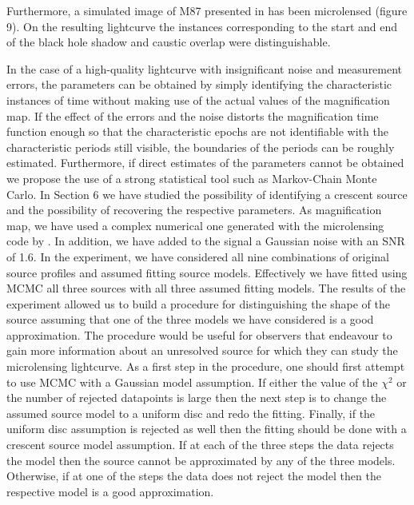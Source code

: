 \documentclass[usenatbib]{mn2e}
\begin{document}
Furthermore, a simulated image of M87 presented in \citep{2012MNRAS.421.1517D} has been microlensed (figure 9). On the resulting lightcurve the instances 
corresponding to the start and end of the black hole shadow and caustic overlap were distinguishable.
    

In the case of a high-quality lightcurve with insignificant noise and measurement errors, the parameters can be obtained 
by simply identifying the characteristic instances of time without making use of the actual values of the magnification
 map. If the effect of the errors and the noise distorts the magnification time function enough so that the 
characteristic epochs are not identifiable with the characteristic periods still visible, the boundaries of the periods 
can be roughly estimated. Furthermore, if direct estimates of the parameters cannot be obtained we propose the use of a strong
statistical tool such as Markov-Chain Monte Carlo. In Section 6  we have studied the possibility of identifying a crescent 
source and  the possibility of recovering the respective parameters. As magnification map, we have used a complex numerical 
one generated with the microlensing code by \cite{1999A&A...346L...5W}. In addition, we have added to the signal a Gaussian 
noise with an SNR of 1.6.  In the experiment, we have considered all nine combinations of original source profiles and assumed fitting source models.
Effectively we have fitted using MCMC all three sources with all three assumed fitting models. The results of the experiment allowed us to build a 
procedure for distinguishing the shape of the source assuming that one of the three models we have considered is a good approximation.  
The procedure would be useful for observers that endeavour to gain more information about an unresolved source for which they can study 
the microlensing lightcurve.  As a first step in the procedure, one should first attempt to use MCMC with a Gaussian model assumption. 
If either the value of the $\chi^2$ or the number of rejected datapoints is large then the next step is to change the assumed source model to 
a uniform disc and redo the fitting. Finally, if the uniform disc assumption is rejected as well then the fitting should be done with a 
crescent source model assumption. If at each of the three steps the data rejects the model then the source cannot be approximated by any of the three models. 
Otherwise, if at one of the steps the data does not reject the model then the respective model is a good approximation.   
\end{document}
